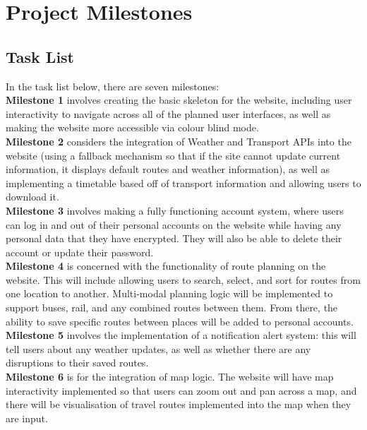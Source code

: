 \documentclass{article}
\begin{document}

\section{Project Milestones}
\subsection{Task List}

In the task list below, there are seven milestones:\\

\textbf{Milestone 1} involves creating the basic skeleton for the website, including user interactivity to navigate across all of the planned user interfaces, as well as making the website more accessible via colour blind mode.  \\

\textbf{Milestone 2} considers the integration of Weather and Transport APIs into the website (using a fallback mechanism so that if the site cannot update current information, it displays default routes and weather information), as well as implementing a timetable based off of transport information and allowing users to download it. \\

\textbf{Milestone 3} involves making a fully functioning account system, where users can log in and out of their personal accounts on the website while having any personal data that they have encrypted. They will also be able to delete their account or update their password. \\ 

\textbf{Milestone 4} is concerned with the functionality of route planning on the website. This will include allowing users to search, select, and sort for routes from one location to another. Multi-modal planning logic will be implemented to support buses, rail, and any combined routes between them. From there, the ability to save specific routes between places will be added to personal accounts. \\

\textbf{Milestone 5} involves the implementation of a notification alert system: this will tell users about any weather updates, as well as whether there are any disruptions to their saved routes. \\

\textbf{Milestone 6} is for the integration of map logic. The website will have map interactivity implemented so that users can zoom out and pan across a map, and there will be visualisation of travel routes implemented into the map when they are input. \\
\end{document}
